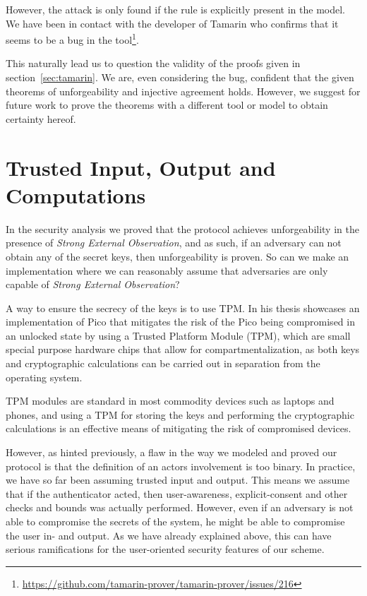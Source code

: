 However, the attack is only found if the rule is explicitly present in the model. We have been in contact with the developer of Tamarin who confirms that it seems to be a bug in the tool\footnote{\url{https://github.com/tamarin-prover/tamarin-prover/issues/216}}. 

This naturally lead us to question the validity of the proofs given in section~\ref{sec:tamarin}. We are, even considering the bug, confident that the given theorems of unforgeability and injective agreement holds. However, we suggest for future work to prove the theorems with a different tool or model to obtain certainty hereof.



\section{Trusted Input, Output and Computations}

In the security analysis we proved that the protocol achieves unforgeability in the presence of \textit{Strong External Observation}, and as such, if an adversary can not obtain any of the secret keys, then unforgeability is proven. So can we make an implementation where we can reasonably assume that adversaries are only capable of \textit{Strong External Observation}?

A way to ensure the secrecy of the keys is to use TPM. In his thesis \citet{bentzon2013security} showcases an implementation of Pico that mitigates the risk of the Pico being compromised in an unlocked state by using a Trusted Platform Module (TPM), which are small special purpose hardware chips that allow for compartmentalization, as both keys and cryptographic calculations can be carried out in separation from the operating system.

TPM modules are standard in most commodity devices such as laptops and phones, and using a TPM for storing the keys and performing the cryptographic calculations is an effective means of mitigating the risk of compromised devices.

However, as hinted previously, a flaw in the way we modeled and proved our protocol is that the definition of an actors involvement is too binary. In practice, we have so far been assuming trusted input and output. This means we assume that if the authenticator acted, then user-awareness, explicit-consent and other checks and bounds was actually performed. However, even if an adversary is not able to compromise the secrets of the system, he might be able to compromise the user in- and output. As we have already explained above, this can have serious ramifications for the user-oriented security features of our scheme. 

